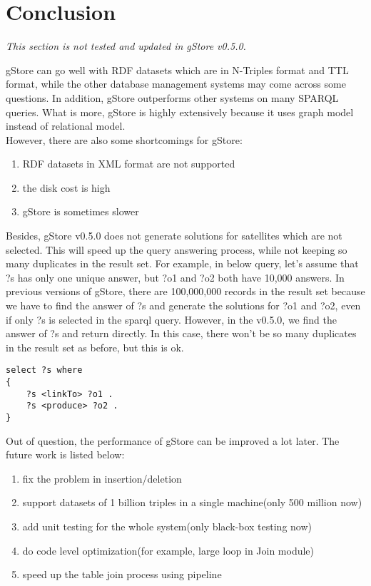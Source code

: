 \documentclass[titlepage, a4paper, 12pt] {article}
\begin{document}
\clearpage

\section{Conclusion}

\emph{This section is not tested and updated in gStore v0.5.0.}

gStore can go well with RDF datasets which are in N-Triples format and TTL format, while the other database
management systems may come across some questions. In addition, gStore outperforms other systems
on many SPARQL queries. What is more, gStore is highly extensively because it uses graph model
instead of relational model. \\

However, there are also some shortcomings for gStore:
\begin{enumerate}
	\item RDF datasets in XML format are not supported
	\item the disk cost is high
	\item gStore is sometimes slower
\end{enumerate}

Besides, gStore v0.5.0 does not generate solutions for satellites which are not selected. 
This will speed up the query answering process, while not keeping so many duplicates in the result set.
For example, in below query, let's assume that ?s has only one unique answer, but ?o1 and ?o2 both have 10,000 answers.
In previous versions of gStore, there are 100,000,000 records in the result set because we have to find the answer of ?s and generate the solutions for ?o1 and ?o2, even if only ?s is selected in the sparql query.
However, in the v0.5.0, we find the answer of ?s and return directly. In this case, there won't be so many duplicates in the result set as before, but this is ok.
\begin{lstlisting}
select ?s where
{
	?s <linkTo> ?o1 .
	?s <produce> ?o2 .
}
\end{lstlisting}

Out of question, the performance of gStore can be improved a lot later. 
The future work is listed below:
\begin{enumerate}
	\item fix the problem in insertion/deletion 
	\item support datasets of 1 billion triples in a single machine(only 500 million now)
	\item add unit testing for the whole system(only black-box testing now)
	\item do code level optimization(for example, large loop in Join module)
	\item speed up the table join process using pipeline
\end{enumerate}
\end{document}
